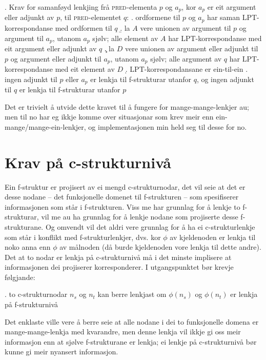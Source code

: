 \documentclass[12pt,a4paper,oneside,draft]{report}
\newcommand{\F}[2]{\textsc{#1}\ensuremath{_{#2}}}
\newcommand{\PRED}{\F{pred}{}}
\begin{document}
\ex. \label{krav:f-ein-mange} Krav for samanføyd lenkjing frå \PRED{}-elementa
$p$ og $a_p$, kor $a_p$ er eit argument eller adjunkt av $p$, til \PRED{}-elementet $q$:
\a. ordformene til $p$ og $a_p$ har saman LPT-korrespondanse med ordformen til $q$
\b. la $A$ vere unionen av argument til $p$ og argument til $a_p$,
    utanom $a_p$ sjølv;
    alle element av $A$ har LPT-korrespondanse med eit argument eller adjunkt av $q$
\c. la $D$ vere unionen av argument eller adjunkt til $p$ og argument
    eller adjunkt til $a_p$, utanom $a_p$ sjølv;
    alle argument av $q$ har LPT-korrespondanse med eit element av $D$
\d. LPT-korrespondansane er ein-til-ein
\e. ingen adjunkt til $p$ eller $a_p$ er lenkja til f-strukturar utanfor $q$, og ingen
    adjunkt til $q$ er lenkja til f-strukturar utanfor $p$

Det er trivielt å utvide dette kravet til å fungere for
mange-mange-lenkjer au; men til no har eg ikkje komme over situasjonar
som krev meir enn ein-mange/mange-ein-lenkjer, og implementasjonen min
held seg til desse for no.

\section{Krav på c-strukturnivå}
\label{sec-3.7}

\label{SEC:subnode}

Ein f-struktur er projisert av ei mengd c-strukturnodar, det vil seie
at det er desse nodane -- det funksjonelle domenet til f-strukturen --
som spesifiserer informasjonen som står i f-strukturen. Viss me har
grunnlag for å lenkje to f-strukturar, vil me au ha grunnlag for å
lenkje nodane som projiserte desse f-strukturane. Og omvendt vil det
aldri vere grunnlag for å ha ei c-strukturlenkje som står i konflikt
med f-strukturlenkjer, dvs. kor $\phi$ av kjeldenoden er lenkja til
noko anna enn $\phi$ av målnoden (då burde kjeldenoden vore lenkja til
dette andre). Det at to nodar er lenkja på c-strukturnivå må i det
minste implisere at informasjonen dei projiserer korresponderer. I
utgangspunktet bør krevje følgjande:

\ex.\label{krav:subnode-f-lenkja} to c-strukturnodar $n_s$ og $n_t$ kan
     berre lenkjast om $\phi(n_s)$ og $\phi(n_t)$ er lenkja på
     f-strukturnivå

Det enklaste ville vere å berre seie at alle nodane i dei to
funksjonelle domena er mange-mange-lenkja med kvarandre, men denne
lenkja vil ikkje gi oss meir informasjon enn at sjølve f-strukturane
er lenkja; ei lenkje på c-strukturnivå bør kunne gi meir nyansert
informasjon.
\end{document}

